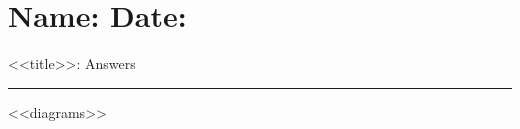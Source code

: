 \documentclass[leqno, 12pt]{article}
\def \HeadingAnswers {\section*{\Large Name: \underline{\hspace{8cm}} \hfill Date: \underline{\hspace{3cm}}} \vspace{-3mm}
{<<title>>: Answers} \vspace{1pt}\hrule}
\begin{document}
\HeadingAnswers
\begin{multicols}{2}

<<diagrams>>

\end{multicols}
\end{document}
